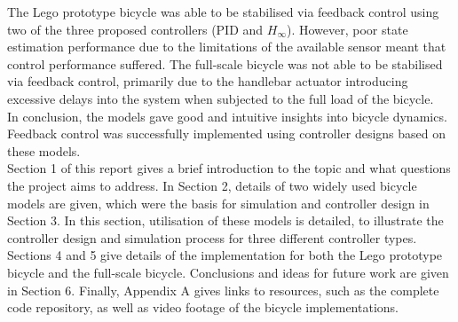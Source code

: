 The Lego prototype bicycle was able to be stabilised via feedback control using two of the three proposed controllers (PID and $H_{\infty}$). However, poor state estimation performance due to the limitations of the available sensor meant that control performance suffered. The full-scale bicycle was not able to be stabilised via feedback control, primarily due to the handlebar actuator introducing excessive delays into the system when subjected to the full load of the bicycle. \\

In conclusion, the models gave good and intuitive insights into bicycle dynamics. Feedback control was successfully implemented using controller designs based on these models. \\

Section 1 of this report gives a brief introduction to the topic and what questions the project aims to address. In Section 2, details of two widely used bicycle models are given, which were the basis for simulation and controller design in Section 3. In this section, utilisation of these models is detailed, to illustrate the controller design and simulation process for three different controller types. Sections 4 and 5 give details of the implementation for both the Lego prototype bicycle and the full-scale bicycle. Conclusions and ideas for future work are given in Section 6. Finally, Appendix A gives links to resources, such as the complete code repository, as well as video footage of the bicycle implementations.

\newpage
{}
\setcounter{page}{1}
\tableofcontents

\newpage
\pagestyle{headings}